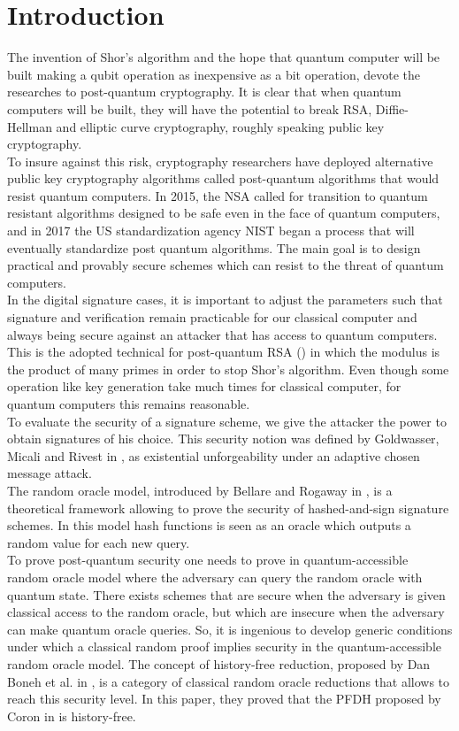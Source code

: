 \documentclass[a4paper,11pt]{article}
\begin{document}
\section{Introduction}
The invention of Shor's algorithm \cite{Shor} and the hope that quantum computer will be built making a qubit operation as inexpensive as a bit operation, devote the researches to post-quantum cryptography.
It is clear that when quantum computers will be built, they will have the potential to break RSA, Diffie-Hellman and elliptic curve cryptography, roughly speaking public key cryptography.\\
To insure against this risk, cryptography researchers have deployed alternative public key cryptography algorithms called post-quantum algorithms that would resist quantum computers. In 2015, the NSA called for transition to quantum resistant algorithms designed to be safe even in the face of quantum computers, and in 2017 the US standardization agency NIST began a process that will eventually standardize post quantum algorithms.
The main goal is to design  practical and provably secure schemes which can resist to the threat of  quantum computers.\\
In the digital signature cases, it is important to adjust the parameters such that signature and verification remain practicable for our classical computer and always being secure against an attacker that has access to quantum computers. This is the adopted technical for post-quantum RSA (\cite{pqRSA}) in which the modulus is the product of many primes in order to stop Shor's algorithm. Even though some operation like key generation take much times for classical computer, for quantum computers this remains reasonable.\\
To evaluate the security of a signature scheme, we give the attacker the power to obtain signatures of his choice. This security notion was defined by Goldwasser,  Micali and Rivest in \cite{Goldwasser}, as existential unforgeability under an adaptive chosen message attack.\\
The random oracle model, introduced by Bellare and Rogaway in \cite{Bellare1}, is a theoretical framework allowing to prove the security of hashed-and-sign signature schemes. In this model hash functions is seen as an oracle which outputs a random value for each new query.\\
To prove post-quantum security one needs to prove in quantum-accessible random oracle model where the adversary can query the random oracle with quantum state. There exists schemes that are secure when the adversary is given classical access to the random oracle, but which are insecure when the adversary can make quantum oracle queries. So, it is ingenious to develop generic conditions under which a classical random proof implies security in the quantum-accessible random oracle model. The concept of history-free reduction, proposed by Dan Boneh et al. in \cite{pqROM}, is a category of classical random oracle reductions that allows to reach this security level. In this paper, they proved that the PFDH proposed by Coron in \cite{Coron-FDH} is history-free.
\end{document}
